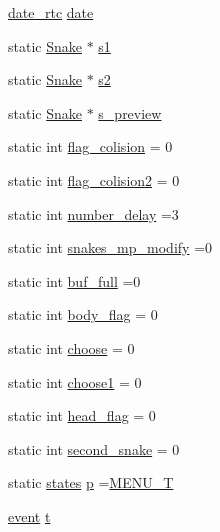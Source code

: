 \begin{DoxyCompactItemize}
\item 
\hyperlink{structdate__rtc}{date\+\_\+rtc} \hyperlink{group__man__events_gaa68c2949762722dfdaa5fa0e70d23cec}{date}
\item 
static \hyperlink{structSnake}{Snake} $\ast$ \hyperlink{group__man__events_gaf79c0d77b0cca9ebf96bbbed1f88aed0}{s1}
\item 
static \hyperlink{structSnake}{Snake} $\ast$ \hyperlink{group__man__events_ga5b853e8b22f27ef547e5b45e4197d308}{s2}
\item 
static \hyperlink{structSnake}{Snake} $\ast$ \hyperlink{group__man__events_gad4cd59e08d196fdec29b274d2f27254b}{s\+\_\+preview}
\item 
static int \hyperlink{group__man__events_ga4cf8437a340f1c3bc00642b3f4fb96ae}{flag\+\_\+colision} = 0
\item 
static int \hyperlink{group__man__events_ga85f22d2e2394a6cf3a343f1140068ea4}{flag\+\_\+colision2} = 0
\item 
static int \hyperlink{group__man__events_ga49dac5534222e1641ae32eba8e7baf8e}{number\+\_\+delay} =3
\item 
static int \hyperlink{group__man__events_ga96e3c9a348a3b68cb9b715a021eb8005}{snakes\+\_\+mp\+\_\+modify} =0
\item 
static int \hyperlink{group__man__events_ga45b2c3de13c3743778747ed17bd97be6}{buf\+\_\+full} =0
\item 
static int \hyperlink{group__man__events_ga50e9227ad82eba24c0fa3bc0fa3c4c94}{body\+\_\+flag} = 0
\item 
static int \hyperlink{group__man__events_ga382290cee9798b0d650c1f2fb55de1d4}{choose} = 0
\item 
static int \hyperlink{group__man__events_ga11ede57042994849c9753d651a6c31f0}{choose1} = 0
\item 
static int \hyperlink{group__man__events_ga2112e7f4b28f5bc73cc834ef6e7d97e1}{head\+\_\+flag} = 0
\item 
static int \hyperlink{group__man__events_ga559fc485a85afead1ca991d70e7c72ee}{second\+\_\+snake} = 0
\item 
static \hyperlink{group__man__events_gaa19be6305a5a4485e1e70de70ed7d677}{states} \hyperlink{group__man__events_ga70c7b8b5ec6a67ce08a8b74a970b88fa}{p} =\hyperlink{group__man__events_ggaa19be6305a5a4485e1e70de70ed7d677a6ecbaab572337a8459ab6ca3a9f05ebb}{M\+E\+N\+U\+\_\+T}
\item 
\hyperlink{group__man__events_ga3b65133bb9997cd1ccf311af0927fc9e}{event} \hyperlink{group__man__events_gac7f56a32062f381248ce9a81e701ff8a}{t}
\end{DoxyCompactItemize}
